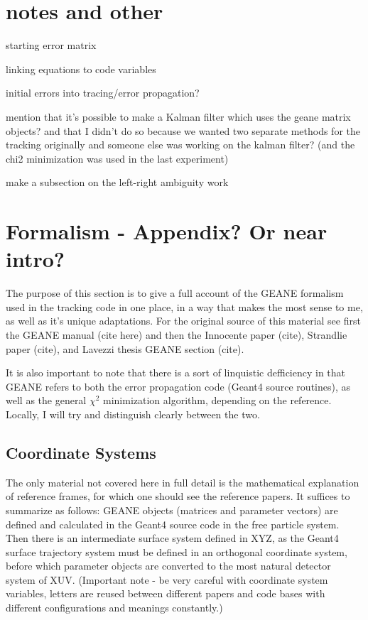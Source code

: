 \documentclass{article}
\begin{document}
\section{notes and other}

  starting error matrix

  linking equations to code variables

  initial errors into tracing/error propagation?

  mention that it's possible to make a Kalman filter which uses the geane matrix objects? and that I didn't do so because we wanted two separate methods for the tracking originally and someone else was working on the kalman filter? (and the chi2 minimization was used in the last experiment)

  make a subsection on the left-right ambiguity work 


\section{Formalism - Appendix? Or near intro?}


The purpose of this section is to give a full account of the GEANE formalism used in the tracking code in one place, in a way that makes the most sense to me, as well as it's unique adaptations. For the original source of this material see first the GEANE manual (cite here) and then the Innocente paper (cite), Strandlie paper (cite), and Lavezzi thesis GEANE section (cite). 

It is also important to note that there is a sort of linquistic defficiency in that GEANE refers to both the error propagation code (Geant4 source routines), as well as the general $\chi^{2}$ minimization algorithm, depending on the reference. Locally, I will try and distinguish clearly between the two.


\subsection{Coordinate Systems}

The only material not covered here in full detail is the mathematical explanation of reference frames, for which one should see the reference papers. It suffices to summarize as follows: GEANE objects (matrices and parameter vectors) are defined and calculated in the Geant4 source code in the free particle system. Then there is an intermediate surface system defined in XYZ, as the Geant4 surface trajectory system must be defined in an orthogonal coordinate system, before which parameter objects are converted to the most natural detector system of XUV. (Important note - be very careful with coordinate system variables, letters are reused between different papers and code bases with different configurations and meanings constantly.)
\end{document}
